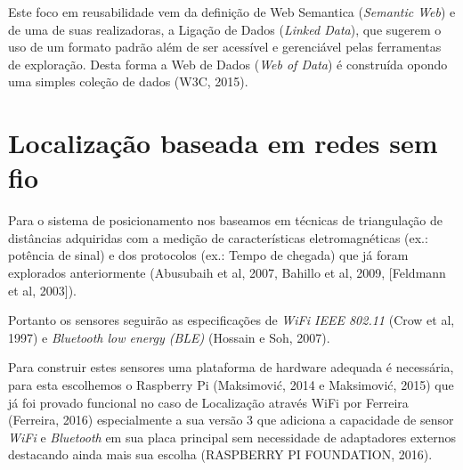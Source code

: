 Este foco em reusabilidade vem da definição de Web Semantica (\textit{Semantic Web}) e de uma de suas realizadoras, a Ligação de Dados (\textit{Linked Data}), que sugerem o uso de um formato padrão além de ser acessível e gerenciável pelas ferramentas de exploração. Desta forma a Web de Dados (\textit{Web of Data}) é construída opondo uma simples coleção de dados \cite{w3c2015} (W3C, 2015).

\section{Localização baseada em redes sem fio}
\label{sec:Localização baseada em redes sem fio}

Para o sistema de posicionamento nos baseamos em técnicas de triangulação de distâncias adquiridas com a medição de características eletromagnéticas (ex.: potência de sinal) e dos protocolos (ex.: Tempo de chegada) que já foram explorados anteriormente 
\cite{Abusubaih2007} \cite{bahillo2009ieee} \cite{Feldmann2003} 
(Abusubaih et al, 2007, Bahillo et al, 2009, [Feldmann et al, 2003]).


Portanto os sensores seguirão as especificações de \textit{WiFi IEEE 802.11} \cite{Crow1997} (Crow et al, 1997) e \textit{Bluetooth low energy (BLE)} \cite{Hossain2007} (Hossain e Soh, 2007).


Para construir estes sensores uma plataforma de hardware adequada é necessária, para esta escolhemos o Raspberry Pi 
\cite{Maksimovic2014} \cite{Maksimovic2015} 
(Maksimović, 2014 e Maksimović, 2015) que já foi provado funcional no caso de Localização através WiFi por Ferreira 
(Ferreira, 2016) 
especialmente a sua versão 3 que adiciona a capacidade de sensor \textit{WiFi} e \textit{Bluetooth} em sua placa principal sem necessidade de adaptadores externos destacando ainda mais sua escolha 
\cite{RPI2016}
(RASPBERRY PI FOUNDATION, 2016).
